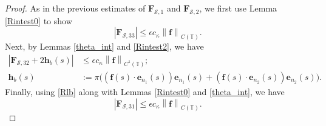 \documentclass[11pt]{article}
\numberwithin{equation}{section}
\newcommand{\T}{\mathbb{T}}
\newcommand{\be}{\bm{e}}
\newcommand{\abs}[1]{\left\lvert #1 \right\rvert}
\newcommand{\norm}[1]{\left\lVert #1 \right\rVert}
\newcommand{\mc}[1]{\mathcal{#1}}
\theoremstyle{definition}
\begin{document}
\begin{proof}
As in the previous estimates of $\bm{F}_{\mc{S},1}$ and $\bm{F}_{\mc{S},2}$, we first use Lemma \ref{Rintest0} to show
\begin{equation}\label{FS33_est}
\abs{\bm{F}_{\mc{S},33}}  \le \epsilon c_\kappa\norm{\bm{f}}_{C(\T)}.
\end{equation}
Next, by Lemmas \ref{theta_int} and \ref{Rintest2}, we have
\begin{equation}\label{FS32_est}
\begin{aligned}
\abs{\bm{F}_{\mc{S},32} + 2\bm{h}_b(s)} &\le \epsilon c_\kappa\norm{\bm{f}}_{C^1(\T)}; \\
\bm{h}_b(s) &:=  \pi \big((\bm{f}(s)\cdot\be_{n_1}(s))\be_{n_1}(s) + (\bm{f}(s)\cdot\be_{n_2}(s))\be_{n_2}(s) \big).
\end{aligned}
\end{equation}
Finally, using \eqref{Rlb} along with Lemmas \ref{Rintest0} and \ref{theta_int}, we have
\begin{equation}\label{FS31_est}
\abs{\bm{F}_{\mc{S},31}} \le \epsilon c_\kappa \norm{\bm{f}}_{C(\T)}.
\end{equation}


\end{proof}
\end{document}
